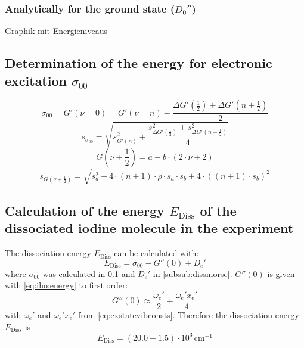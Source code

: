 \subsubsection{Analytically for the ground state ($D_0''$)}

Graphik mit Energieniveaus

\subsection{Determination of the energy for electronic excitation \texorpdfstring{$\sigma_{00}$}{s00}}
\label{sub:sigma00}

\begin{equation}
  \sigma_{00} = G'(\nu = 0) = G'(\nu = n) - \frac{\Delta G' \left( \frac{1}{2} \right) + \Delta G' \left( n + \frac{1}{2} \right) }{2}
\end{equation}
\begin{equation}
  s_{\sigma_{00}} = \sqrt{s_{G'(n)}^2 + \frac{s_{\Delta G' \left( \frac{1}{2} \right)}^2 + s_{\Delta G' \left( n + \frac{1}{2} \right)}^2}{4}}
\end{equation}
\begin{equation}
  G(\nu + \frac{1}{2}) = a - b \cdot (2 \cdot \nu + 2)
\end{equation}
\begin{equation}
  s_{G(\nu + \frac{1}{2})} = \sqrt{s_a^2 + 4 \cdot (n+1) \cdot \rho \cdot s_a \cdot s_b + 4 \cdot ((n+1) \cdot s_b)^2}
\end{equation}

\subsection{Calculation of the energy \texorpdfstring{$E_{\text{Diss}}$}{E diss} of the dissociated iodine molecule in the experiment}
The dissociation energy $E_{\text{Diss}}$ can be calculated with:
\begin{equation}
  E_{\text{Diss}} = \sigma_{00} - G''(0) + D_e'
\end{equation}
where $\sigma_{00}$ was calculated in \ref{sub:sigma00} and $D_e'$ in \ref{subsub:dissmorse}. 
$G''(0)$ is given with \autoref{eq:iho:energy} to first order:
\begin{equation}
  G''(0) \approx \frac{\omega_e'}{2} + \frac{\omega_e' x_e'}{4}
\end{equation}
with $\omega_e'$ and $\omega_e' x_e'$ from \autoref{eq:exstatevibconsts}.
Therefore the dissociation energy $E_{\text{Diss}}$ is
\begin{equation}
  E_{\text{Diss}} = (20.0 \pm 1.5) \cdot 10^3\,\text{cm}^{-1}
\end{equation}


